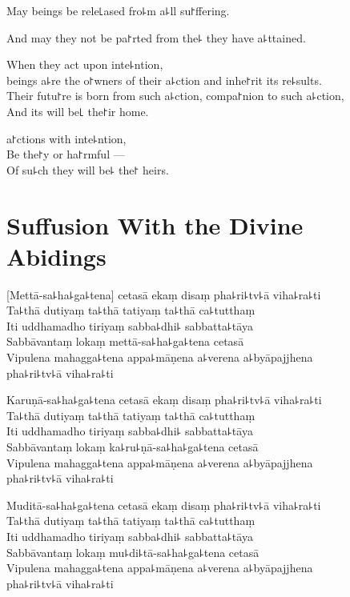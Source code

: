 May  beings be rele꜖ased fro꜕m a꜕ll su꜓ffering.

And may they not be pa꜓rted from the꜕  they have a꜕ttained.

When they act upon inte꜕ntion,\\
 beings a꜕re the o꜓wners of their a꜕ction and inhe꜓rit its re꜕sults.\\
Their futu꜓re is born from such a꜕ction, compa꜓nion to such a꜕ction,\\
And its  will be꜖ the꜓ir home.

 a꜓ctions with inte꜕ntion,\\
Be the꜓y  or ha꜓rmful ---\\
Of su꜕ch  they will be꜕ the꜓ heirs.

\chapter*[Divine Abidings]{Suffusion With the Divine Abidings}%

\delegateSetUseNext


\begin{leader}
\end{leader}

[Mettā-sa꜕ha꜕ga꜕tena] cetasā ekaṃ disaṃ pha꜕ri꜕tv꜕ā viha꜕ra꜕ti\\
Ta꜕thā dutiyaṃ ta꜕thā tatiyaṃ ta꜕thā ca꜕tutthaṃ\\
Iti uddhamadho tiriyaṃ sabba꜕dhi꜕ sabbatta꜕tāya\\
Sabbāvantaṃ lokaṃ mettā-sa꜕ha꜕ga꜕tena cetasā\\
Vipulena mahagga꜕tena appa꜕māṇena a꜕verena a꜕byāpajjhena\\
\vin pha꜕ri꜕tv꜕ā viha꜕ra꜕ti

Karuṇā-sa꜕ha꜕ga꜕tena cetasā ekaṃ disaṃ pha꜕ri꜕tv꜕ā viha꜕ra꜕ti\\
Ta꜕thā dutiyaṃ ta꜕thā tatiyaṃ ta꜕thā ca꜕tutthaṃ\\
Iti uddhamadho tiriyaṃ sabba꜕dhi꜕ sabbatta꜕tāya\\
Sabbāvantaṃ lokaṃ ka꜕ru꜕ṇā-sa꜕ha꜕ga꜕tena cetasā\\
Vipulena mahagga꜕tena appa꜕māṇena a꜕verena a꜕byāpajjhena\\
\vin pha꜕ri꜕tv꜕ā viha꜕ra꜕ti

Muditā-sa꜕ha꜕ga꜕tena cetasā ekaṃ disaṃ pha꜕ri꜕tv꜕ā viha꜕ra꜕ti\\
Ta꜕thā dutiyaṃ ta꜕thā tatiyaṃ ta꜕thā ca꜕tutthaṃ\\
Iti uddhamadho tiriyaṃ sabba꜕dhi꜕ sabbatta꜕tāya\\
Sabbāvantaṃ lokaṃ mu꜕di꜕tā-sa꜕ha꜕ga꜕tena cetasā\\
Vipulena mahagga꜕tena appa꜕māṇena a꜕verena a꜕byāpajjhena\\
\vin pha꜕ri꜕tv꜕ā viha꜕ra꜕ti

